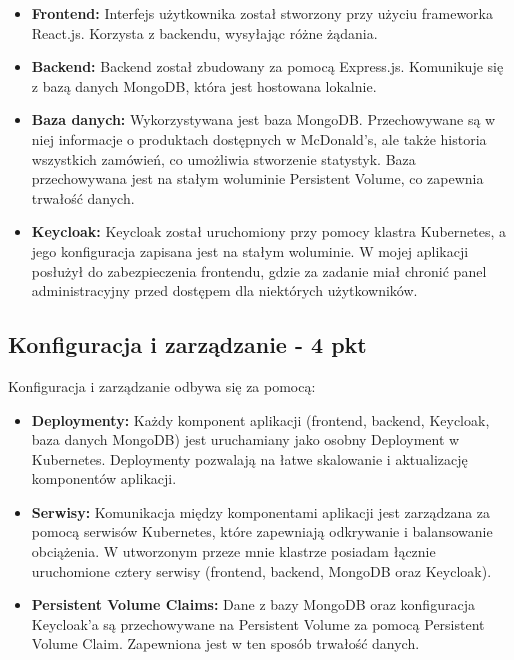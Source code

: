 \documentclass[12pt,a4paper]{article}
\begin{document}
\begin{itemize}
\item \textbf{Frontend:} Interfejs użytkownika został stworzony przy użyciu frameworka React.js. Korzysta z backendu, wysyłając różne żądania.

\item \textbf{Backend:} Backend został zbudowany za pomocą Express.js. Komunikuje się z bazą danych MongoDB, która jest hostowana lokalnie.

\item \textbf{Baza danych:} Wykorzystywana jest baza MongoDB. Przechowywane są w niej informacje o produktach dostępnych w McDonald's, ale także historia wszystkich zamówień, co umożliwia stworzenie statystyk. Baza przechowywana jest na stałym woluminie Persistent Volume, co zapewnia trwałość danych.

\item \textbf{Keycloak:} Keycloak został uruchomiony przy pomocy klastra Kubernetes, a jego konfiguracja zapisana jest na stałym woluminie. W mojej aplikacji posłużył do zabezpieczenia frontendu, gdzie za zadanie miał chronić panel administracyjny przed dostępem dla niektórych użytkowników.
\end{itemize}


\subsection{Konfiguracja i zarządzanie - 4 pkt}
\label{sec:NonFunctionalConditions}

Konfiguracja i zarządzanie odbywa się za pomocą:

\begin{itemize}
\item \textbf{Deploymenty:} Każdy komponent aplikacji (frontend, backend, Keycloak, baza danych MongoDB) jest uruchamiany jako osobny Deployment w Kubernetes. Deploymenty pozwalają na łatwe skalowanie i aktualizację komponentów aplikacji.

\item \textbf{Serwisy:} Komunikacja między komponentami aplikacji jest zarządzana za pomocą serwisów Kubernetes, które zapewniają odkrywanie i balansowanie obciążenia. W utworzonym przeze mnie klastrze posiadam łącznie uruchomione cztery serwisy (frontend, backend, MongoDB oraz Keycloak).

\item \textbf{Persistent Volume Claims:} Dane z bazy MongoDB oraz konfiguracja Keycloak'a są przechowywane na Persistent Volume za pomocą Persistent Volume Claim. Zapewniona jest w ten sposób trwałość danych.
\end{itemize}
\end{document}
